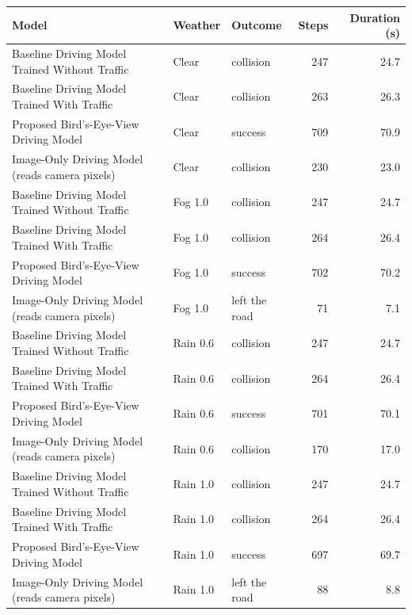 \begin{tabular}{@{}lllrr@{}}\toprule
Model & Weather & Outcome & Steps & Duration (s)\\\midrule
Baseline Driving Model Trained Without Traffic & Clear & collision & 247 & 24.7\\
Baseline Driving Model Trained With Traffic & Clear & collision & 263 & 26.3\\
Proposed Bird's-Eye-View Driving Model & Clear & success & 709 & 70.9\\
Image-Only Driving Model (reads camera pixels) & Clear & collision & 230 & 23.0\\
Baseline Driving Model Trained Without Traffic & Fog 1.0 & collision & 247 & 24.7\\
Baseline Driving Model Trained With Traffic & Fog 1.0 & collision & 264 & 26.4\\
Proposed Bird's-Eye-View Driving Model & Fog 1.0 & success & 702 & 70.2\\
Image-Only Driving Model (reads camera pixels) & Fog 1.0 & left the road & 71 & 7.1\\
Baseline Driving Model Trained Without Traffic & Rain 0.6 & collision & 247 & 24.7\\
Baseline Driving Model Trained With Traffic & Rain 0.6 & collision & 264 & 26.4\\
Proposed Bird's-Eye-View Driving Model & Rain 0.6 & success & 701 & 70.1\\
Image-Only Driving Model (reads camera pixels) & Rain 0.6 & collision & 170 & 17.0\\
Baseline Driving Model Trained Without Traffic & Rain 1.0 & collision & 247 & 24.7\\
Baseline Driving Model Trained With Traffic & Rain 1.0 & collision & 264 & 26.4\\
Proposed Bird's-Eye-View Driving Model & Rain 1.0 & success & 697 & 69.7\\
Image-Only Driving Model (reads camera pixels) & Rain 1.0 & left the road & 88 & 8.8\\
\bottomrule\end{tabular}
